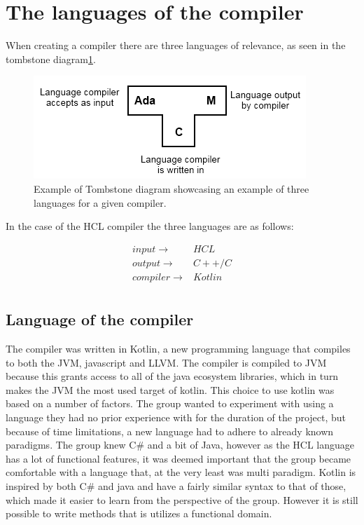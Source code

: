 \section{The languages of the compiler}
When creating a compiler there are three languages of relevance, as seen in the tombstone diagram\ref{fig:TStoneExample}.

\begin{figure}[H]
	\centering
	\includegraphics[width=\textwidth/2+\textwidth/4]{4.Solution/images/T-diagram.png}
	\caption{
		Example of Tombstone diagram showcasing an example of three languages for a given compiler.\cite{TStoneWiki}
	}
	\label{fig:TStoneExample}
\end{figure}
In the case of the HCL compiler the three languages are as follows:

\begin{align*}
input \to & HCL \\
output \to & C++/C \\
compiler \to & Kotlin \\
\end{align*}

\subsection{Language of the compiler}
The compiler was written in Kotlin\cite{KotlinWebsite}, a new programming language that compiles to both the JVM, javascript and LLVM. 
The compiler is compiled to JVM because this grants access to all of the java ecosystem libraries, which in turn makes the JVM the most used target of kotlin.
This choice to use kotlin was based on a number of factors.
The group wanted to experiment with using a language they had no prior experience with for the duration of the project, but because of time limitations, a new language had to adhere to already known paradigms.
The group knew C\# and a bit of Java, however as the HCL language has a lot of functional features, it was deemed important that the group became comfortable with a language that, at the very least was multi paradigm.
Kotlin is inspired by both C\# and java and have a fairly similar syntax to that of those, which made it easier to learn from the perspective of the group.
However it is still possible to write methods that is utilizes a functional domain.

